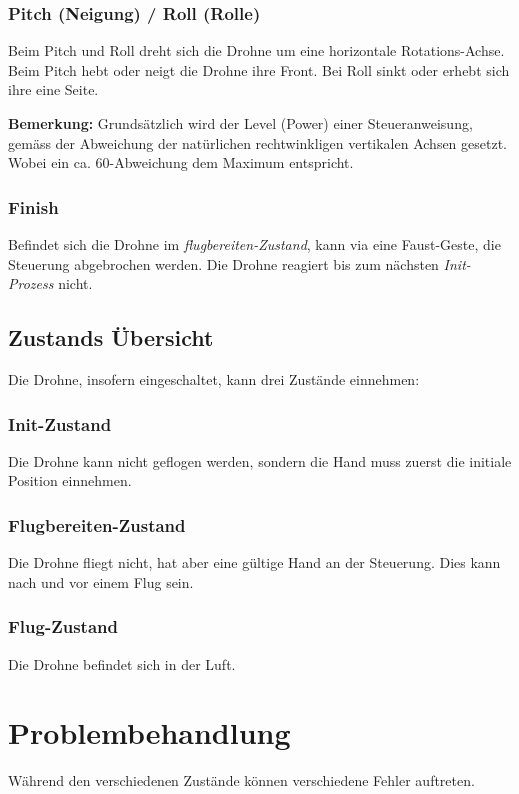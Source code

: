 \subsubsection{Pitch (Neigung) / Roll (Rolle)}
Beim Pitch und Roll dreht sich die Drohne um eine horizontale Rotations-Achse. Beim Pitch hebt oder neigt die Drohne ihre Front. Bei Roll sinkt oder erhebt sich ihre eine Seite.

\textbf{Bemerkung:} Grundsätzlich wird der Level (Power) einer Steueranweisung, gemäss der Abweichung der natürlichen rechtwinkligen vertikalen Achsen gesetzt.
Wobei ein ca. 60\textdegree-Abweichung dem Maximum entspricht.

\subsubsection{Finish}
Befindet sich die Drohne im \textit{flugbereiten-Zustand}, kann via eine Faust-Geste, die Steuerung abgebrochen werden.
Die Drohne reagiert bis zum nächsten \textit{Init-Prozess} nicht.


\subsection{Zustands Übersicht}
Die Drohne, insofern eingeschaltet, kann drei Zustände einnehmen:

\subsubsection{Init-Zustand}
Die Drohne kann nicht geflogen werden, sondern die Hand muss zuerst die initiale Position einnehmen.

\subsubsection{Flugbereiten-Zustand}
Die Drohne fliegt nicht, hat aber eine gültige Hand an der Steuerung. Dies kann nach und vor einem Flug sein.

\subsubsection{Flug-Zustand}
Die Drohne befindet sich in der Luft.



\section{Problembehandlung}
Während den verschiedenen Zustände können verschiedene Fehler auftreten.

